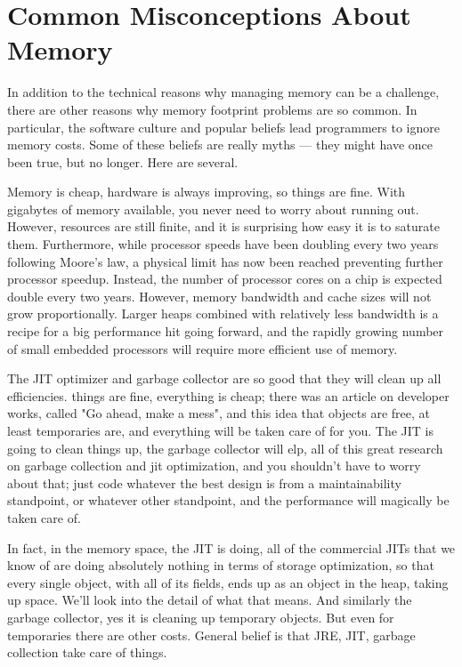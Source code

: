 \section{Common Misconceptions About Memory}

In addition to the technical reasons why managing memory can be a challenge, there
are other reasons why memory footprint problems are so common. In particular,
the software culture and popular beliefs lead programmers to ignore memory
costs. Some of these beliefs are really myths --- they might have once
been true, but no longer. Here are several.

 Memory is cheap, hardware is always improving, so things are fine.
 With gigabytes of memory available, you never need to worry about running out.
However, resources are still finite, and it is surprising how easy it is to
saturate them. Furthermore, while processor speeds have been doubling every two
years following Moore's law, a physical limit has now been reached preventing further processor speedup. 
Instead, the number of processor cores on a chip is expected double every two years. However,
memory bandwidth and cache sizes will not grow proportionally. 
 Larger heaps combined with relatively less bandwidth is a recipe for a big performance hit going forward, 
 and the rapidly growing number of small embedded processors will require more
 efficient use of memory.

 The JIT optimizer and garbage collector are so good that they will
clean up all efficiencies. things are fine, everything is cheap; there was an
article on developer works, called "Go ahead, make a mess",  and this idea that objects are free, at least temporaries are,
 and everything will be taken care of for you. The JIT is going to clean things up, the garbage collector will elp, 
 all of this great research 
  on garbage collection and jit optimization, and you shouldn't have to worry about that; just code whatever the best design 
  is from a maintainability standpoint, or whatever other standpoint, and the performance will magically be taken care of.

In fact, in the memory space, the JIT is doing, all of the commercial JITs that we know of are doing absolutely nothing 
in terms of storage optimization, so that every single object, with all of its fields, ends up as an object in the heap, 
taking up space.  We'll look into the detail of what that means. And similarly the garbage collector, yes it is cleaning up 
temporary objects. But even for temporaries there are other costs.
General belief is that JRE, JIT, garbage collection take care of things.


